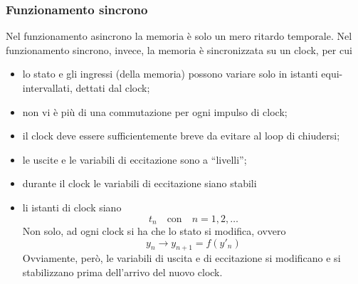 \documentclass[a4paper]{extarticle}
\newcommand{\quotes}[1]{``#1''}
\begin{document}
\vspace{1em}
\subsubsection{Funzionamento sincrono}
Nel funzionamento asincrono la memoria è solo un mero ritardo temporale. Nel funzionamento sincrono, invece, la memoria è sincronizzata su un clock, per cui
\begin{itemize}
    \item lo stato e gli ingressi (della memoria) possono variare solo in istanti equi-intervallati, dettati dal clock;
    \item non vi è più di una commutazione per ogni impulso di clock;
    \item il clock deve essere sufficientemente breve da evitare al loop di chiudersi;
    \item le uscite e le variabili di eccitazione sono a \quotes{livelli};
    \item durante il clock le variabili di eccitazione siano stabili
    \item li istanti di clock siano 
    \[t_n \hspace{1em} \text{con} \hspace{1em} n=1,2,\dots\]
    Non solo, ad ogni clock si ha che lo stato si modifica, ovvero
    \[y_n \to y_{n+1} = f(y'_n)\]
    Ovviamente, però, le variabili di uscita e di eccitazione si modificano e si stabilizzano prima dell'arrivo del nuovo clock.
\end{itemize}

\vspace{1em}
\end{document}
